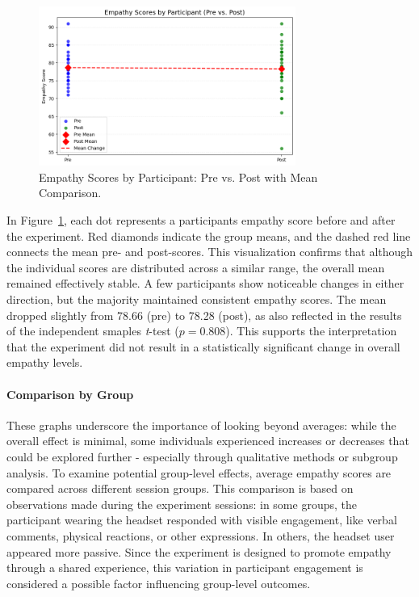 \begin{figure}[htbp]
    \centering
    \includegraphics[width=0.75\textwidth]{../../Figures/emph-comparison-means.png}
    \caption{Empathy Scores by Participant: Pre vs. Post with Mean Comparison.}
    \label{fig:empathy_means_line}
\end{figure}

\vspace{1em}

In Figure~\ref{fig:empathy_means_line}, each dot represents a participants empathy score before and after the experiment. Red diamonds indicate the group means, and the dashed red line connects the mean pre- and post-scores. This visualization confirms that although the individual scores are distributed across a similar range, the overall mean remained effectively stable. A few participants show noticeable changes in either direction, but the majority maintained consistent empathy scores. The mean dropped slightly from 78.66 (pre) to 78.28 (post), as also reflected in the results of the independent smaples \textit{t}-test ($p = 0.808$). This supports the interpretation that the experiment did not result in a statistically significant change in overall empathy levels.

\paragraph{Comparison by Group}

These graphs underscore the importance of looking beyond averages: while the overall effect is minimal, some individuals experienced increases or decreases that could be explored further - especially through qualitative methods or subgroup analysis. To examine potential group-level effects, average empathy scores are compared across different session groups. This comparison is based on observations made during the experiment sessions: in some groups, the participant wearing the headset responded with visible engagement, like verbal comments, physical reactions, or other expressions. In others, the headset user appeared more passive. Since the experiment is designed to promote empathy through a shared experience, this variation in participant engagement is considered a possible factor influencing group-level outcomes.


